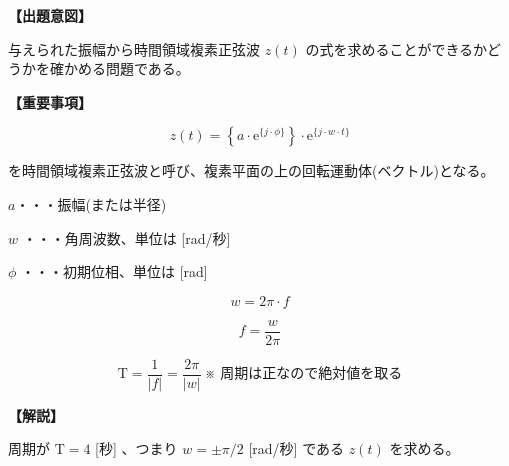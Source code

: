 \noindent \textbf{【出題意図】}

\bigskip
\noindent 与えられた振幅から時間領域複素正弦波 $z(t)$ の式を求めることができるかどうかを確かめる問題である。

\vspace{1em}
\noindent \textbf{【重要事項】}

\[
z(t) =  \left \{ a \cdot \textrm{e}^{\{j \cdot \phi\}} \right \} 
\cdot \textrm{e}^{\{j \cdot w \cdot t \}}
\]

\bigskip
\noindent を時間領域複素正弦波と呼び、複素平面の上の回転運動体(ベクトル)となる。

\bigskip
\noindent\quad  $a$・・・振幅(または半径)

\bigskip
\noindent\quad $w$ ・・・角周波数、単位は [rad/秒]

\bigskip
\noindent\quad $\phi$ ・・・初期位相、単位は [rad]

\[
w = 2\pi \cdot f
\]

\[
f = \frac{w}{2\pi} 
\]

\[
\textrm{T} = \frac{1}{|f|} = \frac{2\pi}{|w|}   \ \mbox{※ 周期は正なので絶対値を取る}
\]

\bigskip

\vspace{1em}
\noindent \textbf{【解説】}

\bigskip
\noindent 周期が $\textrm{T} = 4$ [秒] 、つまり $w = \pm\pi/2$ [rad/秒] である $z(t)$ を求める。
